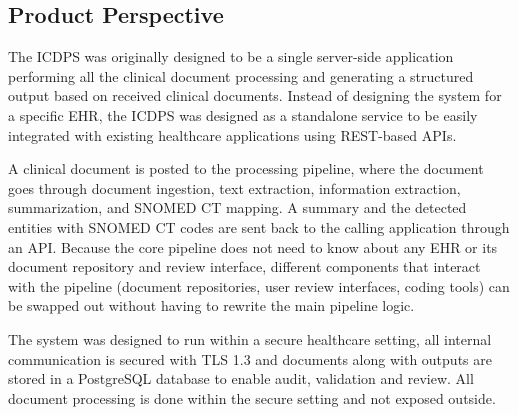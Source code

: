 \subsection{Product Perspective}

The ICDPS was originally designed to be a single server-side application performing all the clinical document processing and generating a structured output based on received clinical documents. Instead of designing the system for a specific EHR, the ICDPS was designed as a standalone service to be easily integrated with existing healthcare applications using REST-based APIs.

A clinical document is posted to the processing pipeline, where the document goes through document ingestion, text extraction, information extraction, summarization, and SNOMED CT mapping. A summary and the detected entities with SNOMED CT codes are sent back to the calling application through an API. Because the core pipeline does not need to know about any EHR or its document repository and review interface, different components that interact with the pipeline (document repositories, user review interfaces, coding tools) can be swapped out without having to rewrite the main pipeline logic.

The system was designed to run within a secure healthcare setting, all internal communication is secured with TLS 1.3 and documents along with outputs are stored in a PostgreSQL database to enable audit, validation and review. All document processing is done within the secure setting and not exposed outside.

